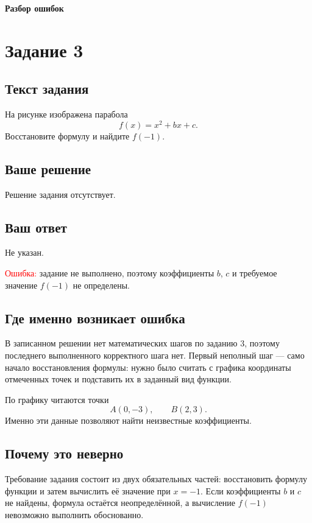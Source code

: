 \documentclass[12pt,a4paper]{article}
\begin{document}
\newpage
\thispagestyle{empty}
\vspace*{\fill}
\begin{center}
  {\Huge\bfseries Разбор ошибок}
\end{center}
\vspace*{\fill}
\newpage

\label{task:3}
\section*{Задание 3}

\subsection*{Текст задания}
На рисунке изображена парабола
\[
  f(x)=x^2+bx+c.
\]
Восстановите формулу и найдите \(f(-1)\).

\subsection*{Ваше решение}
Решение задания отсутствует.

\subsection*{Ваш ответ}
Не указан.

\textcolor{red}{Ошибка:} задание не выполнено, поэтому коэффициенты \(b\), \(c\) и требуемое значение \(f(-1)\) не определены.

\subsection*{Где именно возникает ошибка}
В записанном решении нет математических шагов по заданию 3, поэтому последнего выполненного корректного шага нет. Первый неполный шаг --- само начало восстановления формулы: нужно было считать с графика координаты отмеченных точек и подставить их в заданный вид функции.

По графику читаются точки
\[
  A(0,-3), \qquad B(2,3).
\]
Именно эти данные позволяют найти неизвестные коэффициенты.

\subsection*{Почему это неверно}
Требование задания состоит из двух обязательных частей: восстановить формулу функции и затем вычислить её значение при \(x=-1\). Если коэффициенты \(b\) и \(c\) не найдены, формула остаётся неопределённой, а вычисление \(f(-1)\) невозможно выполнить обоснованно.
\end{document}
